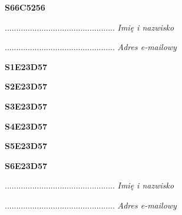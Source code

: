 \begin{turn}{90}\huge \textbf{S66C5256}\end{turn}

\begin{turn}{90}\begin{minipage}{\linewidth} \vspace{20mm} ................................................  \textit{Imię i nazwisko}\end{minipage}\end{turn}

\begin{turn}{90}\begin{minipage}{\linewidth} \vspace{20mm} ................................................  \textit{Adres e-mailowy}\end{minipage}\end{turn}

\begin{turn}{90}\huge \textbf{S1E23D57}\end{turn}

\begin{turn}{90}\huge \textbf{S2E23D57}\end{turn}

\begin{turn}{90}\huge \textbf{S3E23D57}\end{turn}

\begin{turn}{90}\huge \textbf{S4E23D57}\end{turn}

\begin{turn}{90}\huge \textbf{S5E23D57}\end{turn}

\begin{turn}{90}\huge \textbf{S6E23D57}\end{turn}

\begin{turn}{90}\begin{minipage}{\linewidth} \vspace{20mm} ................................................  \textit{Imię i nazwisko}\end{minipage}\end{turn}

\begin{turn}{90}\begin{minipage}{\linewidth} \vspace{20mm} ................................................  \textit{Adres e-mailowy}\end{minipage}\end{turn}

